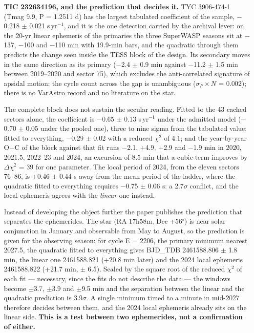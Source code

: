 \documentclass{aa}
\begin{document}
\textbf{TIC 232634196, and the prediction that decides it.} TYC 3906-474-1 (Tmag 9.9, P = 1.2511 d) has the largest tabulated coefficient of the sample, $-$0.218 $\pm$ 0.021 s\,yr$^{-1}$, and it is the one detection carried by the archival lever: on the 20-yr linear ephemeris of the primaries the three SuperWASP seasons sit at $-$137, $-$100 and $-$110 min with 19.9-min bars, and the quadratic through them predicts the change seen inside the TESS block of the design. Its secondary moves in the same direction as its primary ($-$2.4 $\pm$ 0.9 min against $-$11.2 $\pm$ 1.5 min between 2019--2020 and sector 75), which excludes the anti-correlated signature of apsidal motion; the cycle count across the gap is unambiguous ($\sigma_P \times N$ = 0.002); there is no VarAstro record and no literature on the star.

The complete block does not sustain the secular reading. Fitted to the 43 cached sectors alone, the coefficient is $-$0.65 $\pm$ 0.13 s\,yr$^{-1}$ under the admitted model ($-$0.70 $\pm$ 0.05 under the pooled one), three to nine sigma from the tabulated value; fitted to everything, $-$0.29 $\pm$ 0.02 with a reduced $\chi^2$ of 4.1; and the year-by-year O$-$C of the block against that fit runs $-$2.1, +4.9, +2.9 and $-$1.9 min in 2020, 2021.5, 2022--23 and 2024, an excursion of 8.5 min that a cubic term improves by $\Delta\chi^2$ = 39 for one parameter. The local period of 2024, from the eleven sectors 76--86, is +0.46 $\pm$ 0.44 s away from the mean period of the ladder, where the quadratic fitted to everything requires $-$0.75 $\pm$ 0.06 s: a 2.7$\sigma$ conflict, and the local ephemeris agrees with the \textit{linear} one instead.

Instead of developing the object further the paper publishes the prediction that separates the ephemerides. The star (RA 17h58m, Dec +56$^\circ$) is near solar conjunction in January and observable from May to August, so the prediction is given for the observing season: for cycle E = 2206, the primary minimum nearest 2027.5, the quadratic fitted to everything gives BJD\_TDB 2461588.806 $\pm$ 1.8 min, the linear one 2461588.821 (+20.8 min later) and the 2024 local ephemeris 2461588.822 (+21.7 min, $\pm$ 6.5). Scaled by the square root of the reduced $\chi^2$ of each fit --- necessary, since the fits do not describe the data --- the windows become $\pm$3.7, $\pm$3.9 and $\pm$9.5 min and the separation between the linear and the quadratic prediction is 3.9$\sigma$. A single minimum timed to a minute in mid-2027 therefore decides between them, and the 2024 local ephemeris already sits on the linear side. \textbf{This is a test between two ephemerides, not a confirmation of either.}
\end{document}

